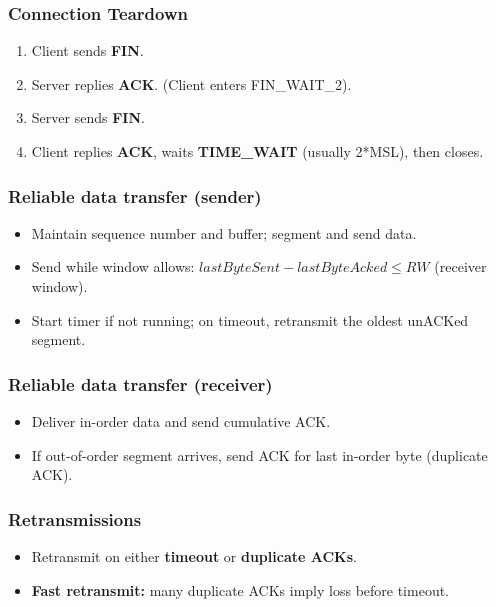 \subsubsection{Connection Teardown}
\begin{enumerate}
    \item Client sends \textbf{FIN}.
    \item Server replies \textbf{ACK}. (Client enters FIN\_WAIT\_2).
    \item Server sends \textbf{FIN}.
    \item Client replies \textbf{ACK}, waits \textbf{TIME\_WAIT} (usually 2*MSL), then closes.
\end{enumerate}

\subsubsection{Reliable data transfer (sender)}
\begin{itemize}
	\item Maintain sequence number and buffer; segment and send data.
	\item Send while window allows: $lastByteSent - lastByteAcked \le RW$ (receiver window).
	\item Start timer if not running; on timeout, retransmit the oldest unACKed segment.
\end{itemize}

\subsubsection{Reliable data transfer (receiver)}
\begin{itemize}
	\item Deliver in-order data and send cumulative ACK.
	\item If out-of-order segment arrives, send ACK for last in-order byte (duplicate ACK).
\end{itemize}

\subsubsection{Retransmissions}
\begin{itemize}
	\item Retransmit on either \textbf{timeout} or \textbf{duplicate ACKs}.
	\item \textbf{Fast retransmit:} many duplicate ACKs imply loss before timeout.
\end{itemize}

